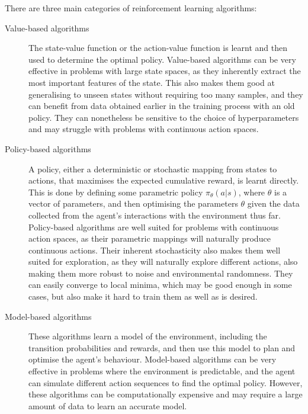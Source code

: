 There are three main categories of reinforcement learning algorithms:
\begin{description}
    \item[Value-based algorithms]
        The state-value function or the action-value function is learnt and then used to determine the optimal policy.
        Value-based algorithms can be very effective in problems with large state spaces, as they inherently extract the most important features of the state.
        This also makes them good at generalising to unseen states without requiring too many samples, and they can benefit from data obtained earlier in the training process with an old policy.
        They can nonetheless be sensitive to the choice of hyperparameters and may struggle with problems with continuous action spaces.


    \item[Policy-based algorithms]
        A policy, either a deterministic or stochastic mapping from states to actions, that maximises the expected cumulative reward, is learnt directly.
        This is done by defining some parametric policy $\pi_\theta(a | s)$, where $\theta$ is a vector of parameters, and then optimising the parameters $\theta$ given the data collected from the agent's interactions with the environment thus far.
        Policy-based algorithms are well suited for problems with continuous action spaces, as their parametric mappings will naturally produce continuous actions.
        Their inherent stochasticity also makes them well suited for exploration, as they will naturally explore different actions, also making them more robust to noise and environmental randomness.
        They can easily converge to local minima, which may be good enough in some cases, but also make it hard to train them as well as is desired.

    \item[Model-based algorithms]
        These algorithms learn a model of the environment, including the transition probabilities and rewards, and then use this model to plan and optimise the agent's behaviour.
        Model-based algorithms can be very effective in problems where the environment is predictable, and the agent can simulate different action sequences to find the optimal policy.
        However, these algorithms can be computationally expensive and may require a large amount of data to learn an accurate model.

\end{description}

